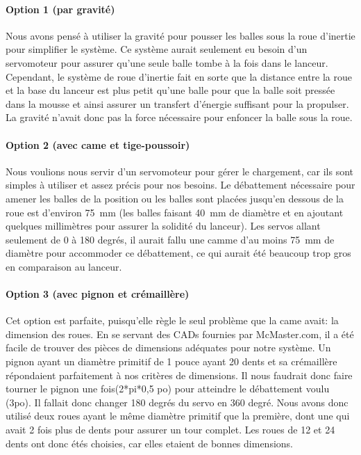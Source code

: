 \paragraph{Option 1 (par gravité)}
Nous avons pensé à utiliser la gravité pour pousser les balles sous la roue d’inertie pour simplifier le système.
Ce système aurait seulement eu besoin d’un servomoteur pour assurer qu’une seule balle tombe à la fois dans le lanceur.
Cependant, le système de roue d’inertie fait en sorte que la distance entre la roue et la base du lanceur est plus petit qu’une balle pour que la balle soit pressée dans la mousse et ainsi assurer un transfert d’énergie suffisant pour la propulser.
La gravité n’avait donc pas la force nécessaire pour enfoncer la balle sous la roue.

\paragraph{Option 2 (avec came et tige-poussoir)}
Nous voulions nous servir d’un servomoteur pour gérer le chargement, car ils sont simples à utiliser et assez précis pour nos besoins.
Le débattement nécessaire pour amener les balles de la position ou les balles sont placées jusqu’en dessous de la roue est d’environ 75~mm (les balles faisant 40~mm de diamètre et en ajoutant quelques millimètres pour assurer la solidité du lanceur).
Les servos allant seulement de 0 à 180 degrés, il aurait fallu une camme d’au moins 75~mm de diamètre pour accommoder ce débattement, ce qui aurait été beaucoup trop gros en comparaison au lanceur.

\paragraph{Option 3 (avec pignon et crémaillère)}
Cet option est parfaite, puisqu’elle règle le seul problème que la came avait: la dimension des roues.
En se servant des CADs fournies par McMaster.com, il a été facile de trouver des pièces de dimensions adéquates pour notre système.
Un pignon ayant un diamètre primitif de 1 pouce ayant 20 dents et sa crémaillère répondaient parfaitement à nos critères de dimensions.
Il nous faudrait donc faire tourner le pignon une fois(2*pi*0,5 po) pour atteindre le débattement voulu (3po).
Il fallait donc changer 180 degrés du servo en 360 degré.
Nous avons donc utilisé deux roues ayant le même diamètre primitif que la première, dont une qui avait 2 fois plus de dents pour assurer un tour complet.
Les roues de 12 et 24 dents ont donc étés choisies, car elles etaient de bonnes dimensions.

